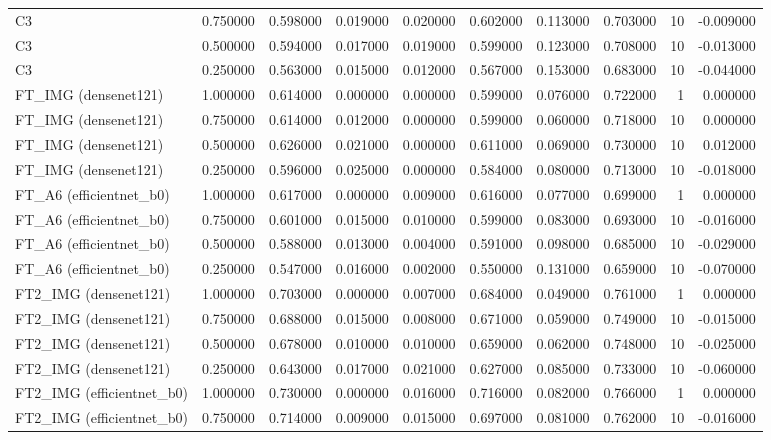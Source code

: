 \begin{table}
\begin{tabular}{lrrrrrrrrr}
C3 & 0.750000 & 0.598000 & 0.019000 & 0.020000 & 0.602000 & 0.113000 & 0.703000 & 10 & -0.009000 \\
C3 & 0.500000 & 0.594000 & 0.017000 & 0.019000 & 0.599000 & 0.123000 & 0.708000 & 10 & -0.013000 \\
C3 & 0.250000 & 0.563000 & 0.015000 & 0.012000 & 0.567000 & 0.153000 & 0.683000 & 10 & -0.044000 \\
FT\_IMG (densenet121) & 1.000000 & 0.614000 & 0.000000 & 0.000000 & 0.599000 & 0.076000 & 0.722000 & 1 & 0.000000 \\
FT\_IMG (densenet121) & 0.750000 & 0.614000 & 0.012000 & 0.000000 & 0.599000 & 0.060000 & 0.718000 & 10 & 0.000000 \\
FT\_IMG (densenet121) & 0.500000 & 0.626000 & 0.021000 & 0.000000 & 0.611000 & 0.069000 & 0.730000 & 10 & 0.012000 \\
FT\_IMG (densenet121) & 0.250000 & 0.596000 & 0.025000 & 0.000000 & 0.584000 & 0.080000 & 0.713000 & 10 & -0.018000 \\
FT\_A6 (efficientnet\_b0) & 1.000000 & 0.617000 & 0.000000 & 0.009000 & 0.616000 & 0.077000 & 0.699000 & 1 & 0.000000 \\
FT\_A6 (efficientnet\_b0) & 0.750000 & 0.601000 & 0.015000 & 0.010000 & 0.599000 & 0.083000 & 0.693000 & 10 & -0.016000 \\
FT\_A6 (efficientnet\_b0) & 0.500000 & 0.588000 & 0.013000 & 0.004000 & 0.591000 & 0.098000 & 0.685000 & 10 & -0.029000 \\
FT\_A6 (efficientnet\_b0) & 0.250000 & 0.547000 & 0.016000 & 0.002000 & 0.550000 & 0.131000 & 0.659000 & 10 & -0.070000 \\
FT2\_IMG (densenet121) & 1.000000 & 0.703000 & 0.000000 & 0.007000 & 0.684000 & 0.049000 & 0.761000 & 1 & 0.000000 \\
FT2\_IMG (densenet121) & 0.750000 & 0.688000 & 0.015000 & 0.008000 & 0.671000 & 0.059000 & 0.749000 & 10 & -0.015000 \\
FT2\_IMG (densenet121) & 0.500000 & 0.678000 & 0.010000 & 0.010000 & 0.659000 & 0.062000 & 0.748000 & 10 & -0.025000 \\
FT2\_IMG (densenet121) & 0.250000 & 0.643000 & 0.017000 & 0.021000 & 0.627000 & 0.085000 & 0.733000 & 10 & -0.060000 \\
FT2\_IMG (efficientnet\_b0) & 1.000000 & 0.730000 & 0.000000 & 0.016000 & 0.716000 & 0.082000 & 0.766000 & 1 & 0.000000 \\
FT2\_IMG (efficientnet\_b0) & 0.750000 & 0.714000 & 0.009000 & 0.015000 & 0.697000 & 0.081000 & 0.762000 & 10 & -0.016000 \\

\end{tabular}
\end{table}

